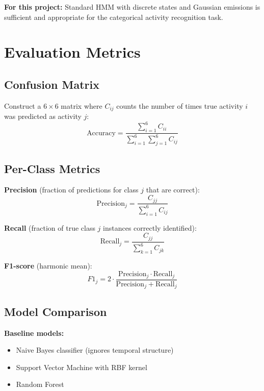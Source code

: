 \documentclass[11pt,a4paper]{article}
\begin{document}
\textbf{For this project:} Standard HMM with discrete states and Gaussian emissions is sufficient and appropriate for the categorical activity recognition task.

\section{Evaluation Metrics}

\subsection{Confusion Matrix}

Construct a $6 \times 6$ matrix where $C_{ij}$ counts the number of times true activity $i$ was predicted as activity $j$:
\begin{equation}
\text{Accuracy} = \frac{\sum_{i=1}^{6} C_{ii}}{\sum_{i=1}^{6}\sum_{j=1}^{6} C_{ij}}
\end{equation}

\subsection{Per-Class Metrics}

\textbf{Precision} (fraction of predictions for class $j$ that are correct):
\begin{equation}
\text{Precision}_j = \frac{C_{jj}}{\sum_{i=1}^{6} C_{ij}}
\end{equation}

\textbf{Recall} (fraction of true class $j$ instances correctly identified):
\begin{equation}
\text{Recall}_j = \frac{C_{jj}}{\sum_{k=1}^{6} C_{jk}}
\end{equation}

\textbf{F1-score} (harmonic mean):
\begin{equation}
F1_j = 2 \cdot \frac{\text{Precision}_j \cdot \text{Recall}_j}{\text{Precision}_j + \text{Recall}_j}
\end{equation}

\subsection{Model Comparison}

\textbf{Baseline models:}
\begin{itemize}[leftmargin=*]
    \item Naive Bayes classifier (ignores temporal structure)
    \item Support Vector Machine with RBF kernel
    \item Random Forest
\end{itemize}
\end{document}

